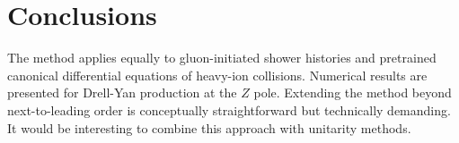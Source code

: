 \section{Conclusions}\label{sec:conclusions}

The method applies equally to gluon-initiated shower histories and
pretrained canonical differential equations of heavy-ion collisions.
Numerical results are presented for Drell-Yan production at the $Z$
pole. Extending the method beyond next-to-leading order is conceptually
straightforward but technically demanding. It would be interesting to
combine this approach with unitarity methods.

